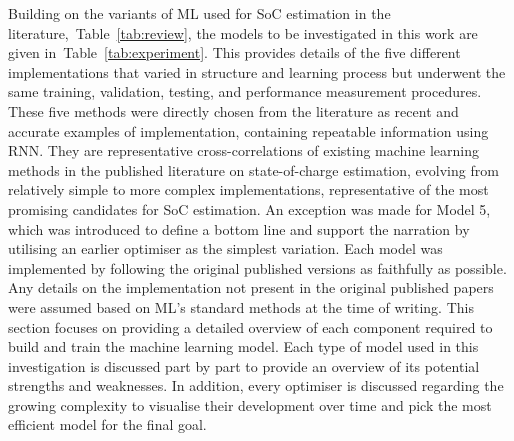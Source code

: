 %
Building on the variants of ML used for SoC estimation in the literature,~\mbox{Table~\ref{tab:review}}, the models to be investigated in this work are given in~\mbox{Table~\ref{tab:experiment}}.
This provides details of the five different implementations that varied in structure and learning process but underwent the same training, validation, testing, and performance measurement procedures.
These five methods were directly chosen from the literature as recent and accurate examples of implementation, containing repeatable information using RNN.
They are representative cross-correlations of existing machine learning methods in the published literature on state-of-charge estimation, evolving from relatively simple to more complex implementations, representative of the most promising candidates for SoC estimation.
An exception was made for Model 5, which was introduced to define a bottom line and support the narration by utilising an earlier optimiser as the simplest variation.
Each model was implemented by following the original published versions as faithfully as possible.
Any details on the implementation not present in the original published papers were assumed based on ML's standard methods at the time of writing.
This section focuses on providing a detailed overview of each component required to build and train the machine learning model.
Each type of model used in this investigation is discussed part by part to provide an overview of its potential strengths and weaknesses.
In addition, every optimiser is discussed regarding the growing complexity to visualise their development over time and pick the most efficient model for the final goal.
